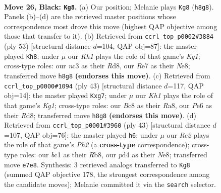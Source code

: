 \documentclass[11pt]{article}
\begin{document}
\clearpage

\begin{figure}[p]\centering
\begin{subfigure}{0.46\textwidth}\centering
\resizebox{\linewidth}{!}{%
\newchessgame
\chessboard[
  setfen={2bq1b1k/rp1pr2p/p3pp2/2P4Q/P1nP2B1/2N2N1P/1P3PK1/R1B2R2 b - - 2 26},
  showmover=false,
  pgfstyle=straightmove, color=movearrow, markmove={h8-g8}
]}
\caption{}
\end{subfigure}\hfill
\begin{subfigure}{0.46\textwidth}\centering
\resizebox{\linewidth}{!}{%
\newchessgame
\chessboard[
  setfen={r2rn1k1/1q2bppp/2bpp3/1p6/1P1BPP2/2NR1BQP/2P3PK/1R6 b - - 10 27},
  showmover=false,
  pgfstyle=straightmove, color=movearrow, markmove={g8-h8}
]}
\caption{}
\end{subfigure}
\\[4pt]
\begin{subfigure}{0.46\textwidth}\centering
\resizebox{\linewidth}{!}{%
\newchessgame
\chessboard[
  setfen={r2r2k1/1p1nqpBp/2bpp1p1/p7/2P1P3/1PN1Q2P/P4PP1/2RR1BK1 b - - 0 22},
  showmover=false,
  pgfstyle=straightmove, color=movearrow, markmove={g8-g7}
]}
\caption{}
\end{subfigure}\hfill
\begin{subfigure}{0.46\textwidth}\centering
\resizebox{\linewidth}{!}{%
\newchessgame
\chessboard[
  setfen={1r2n1k1/2qrbppp/2bpp3/1p6/1P1BPP2/2NR1BQ1/2P3PP/4R2K b - - 2 22},
  showmover=false,
  pgfstyle=straightmove, color=movearrow, markmove={h7-h6}
]}
\caption{}
\end{subfigure}
\caption{\textbf{Move 26, Black: \texttt{Kg8}.} (a) Our position; Melanie plays \texttt{Kg8} (\texttt{h8g8}). Panels (b)--(d) are the retrieved master positions whose correspondence most drove this move (highest QAP objective among those that transfer to it). (b) Retrieved from \texttt{ccrl\_top\_p0002\#3884} (ply 53) [structural distance $d$=104, QAP obj=87]: the master played \texttt{Kh8}; under $\mu$ our \emph{Kh1} plays the role of that game's \emph{Kg1}; cross-type roles: our \emph{n}c3 as their \emph{R}d8, our \emph{R}e7 as their \emph{N}e8; transferred move \texttt{h8g8} \textbf{(endorses this move)}. (c) Retrieved from \texttt{ccrl\_top\_p0000\#1094} (ply 43) [structural distance $d$=117, QAP obj=14]: the master played \texttt{Kxg7}; under $\mu$ our \emph{Kh1} plays the role of that game's \emph{Kg1}; cross-type roles: our \emph{B}c8 as their \emph{R}a8, our \emph{P}e6 as their \emph{R}d8; transferred move \texttt{h8g8} \textbf{(endorses this move)}. (d) Retrieved from \texttt{ccrl\_top\_p0001\#3960} (ply 43) [structural distance $d$=107, QAP obj=76]: the master played \texttt{h6}; under $\mu$ our \emph{Re2} plays the role of that game's \emph{Ph2} (a \textbf{cross-type} correspondence); cross-type roles: our \emph{b}c1 as their \emph{R}b8, our \emph{p}d4 as their \emph{N}e8; transferred move \texttt{e7e8}. Synthesis: 3 retrieved analogs transferred to \texttt{Kg8} (summed QAP objective 178, the strongest correspondence among the candidate moves); Melanie committed it via the \texttt{search} selector.}
\label{fig:thought-m51}
\end{figure}
\end{document}
